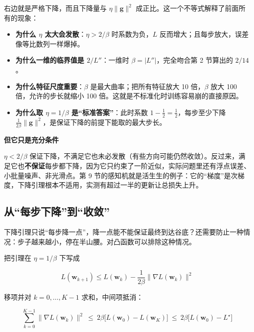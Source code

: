 \documentclass[UTF8, a4paper, zihao=-4, fontset=none]{ctexart}
\begin{document}
右边就是严格下降，而且下降量与 $\eta\|\mathbf{g}\|^2$ 成正比。这一个不等式解释了前面所有的现象：



\begin{itemize}
\item \textbf{为什么 $\eta$ 太大会发散}：$\eta>2/\beta$ 时系数为负，$L$ 反而增大；且每步放大，误差像等比数列一样爆掉。
\item \textbf{为什么一维的临界值是 $2/L''$}：一维时 $\beta=|L''|$，完全吻合第 2 节算出的 $2/14$。
\item \textbf{为什么特征尺度重要}：$\beta$ 是最大曲率；把所有特征放大 10 倍，$\beta$ 放大 100 倍，允许的步长就缩小 100 倍。这就是不标准化时训练容易崩的直接原因。
\item \textbf{为什么取 $\eta=1/\beta$ 是“标准答案”}：此时系数 $1-\frac12=\frac12$，每步至少下降 $\frac{1}{2\beta}\|\mathbf{g}\|^2$，是保证下降的前提下能取的最大步长。
\end{itemize}



\begin{warnbox}
{\bfseries\sffamily\small\color{warn} 但它只是充分条件}\par\vspace{2pt}
$\eta<2/\beta$ 保证下降，不满足它也未必发散（有些方向可能仍然收敛）。反过来，满足它也\textbf{不保证}每步都下降，因为它只约束了一阶近似，实际问题里还有浮点误差、小批量噪声、非光滑点。第 9 节的感知机就是活生生的例子：它的“梯度”是次梯度，下降引理根本不适用，实测有超过一半的更新让总损失上升。


\end{warnbox}




\subsection{从“每步下降”到“收敛”}



下降引理只说“每步降一点”，降一点能不能保证最终到达谷底？还需要防止一种情况：步子越来越小，停在半山腰。对凸函数可以排除这种情况。



把引理在 $\eta=1/\beta$ 下写成


\[
L(\mathbf{w}_{k+1})\le L(\mathbf{w}_k)-\frac{1}{2\beta}\|\nabla L(\mathbf{w}_k)\|^2
\]


移项并对 $k=0,\dots,K-1$ 求和，中间项抵消：


\[
\sum_{k=0}^{K-1}\|\nabla L(\mathbf{w}_k)\|^2\ \le\ 2\beta\big[L(\mathbf{w}_0)-L(\mathbf{w}_K)\big]\ \le\ 2\beta\big[L(\mathbf{w}_0)-L^\star\big]
\]
\end{document}
